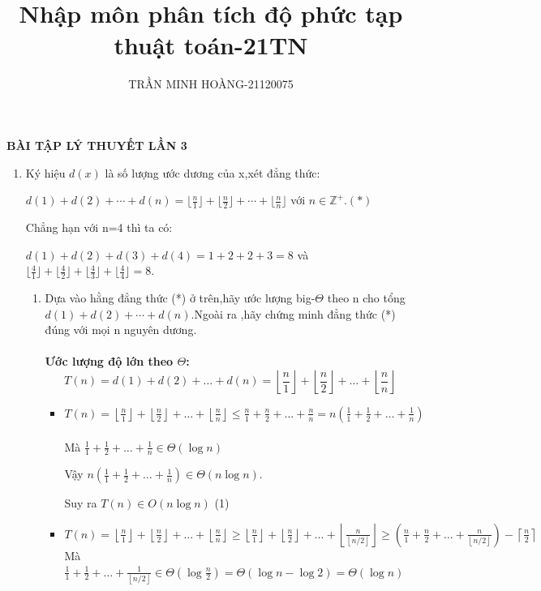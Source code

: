 \documentclass[12pt,a4paper]{article}
\title{\LARGE{\textbf{Nhập môn phân tích độ phức tạp thuật toán-21TN}}}
\author{TRẦN MINH HOÀNG-21120075}
\date{} %
\begin{document}
\maketitle
\begin{center}
    \textbf{BÀI TẬP LÝ THUYẾT LẦN 3}
\end{center}
\begin{enumerate}[label=\textbf{Câu 1:} ]
    \item Ký hiệu $d(x) $ là số lượng ước dương của x,xét đẳng thức:
          \begin{center}
              $d(1)+d(2)+\cdots+d(n)=\lfloor \frac{n}{1} \rfloor+\lfloor \frac{n}{2} \rfloor+\cdots+\lfloor \frac{n}{n} \rfloor $ với $n \in \mathbb{Z^+}.(*)$
          \end{center}
          Chẳng hạn với n=4 thì ta có:
          \begin{adjustwidth}{1cm}{}
              $d(1)+d(2)+d(3)+d(4)=1+2+2+3=8 $ và $\lfloor \frac{4}{1} \rfloor+\lfloor \frac{4}{2} \rfloor+\lfloor \frac{4}{3} \rfloor+\lfloor\frac{4}{4} \rfloor=8 .$
          \end{adjustwidth}
          \begin{enumerate}[label=\alph*)]
              \item Dựa vào hằng đẳng thức (*) ở trên,hãy ước lượng big-$\Theta $ theo n cho tổng $d(1)+d(2)+\cdots+d(n).$Ngoài ra ,hãy chứng minh đẳng thức (*) đúng với mọi n nguyên dương.\\ \\
              \textbf{Ước lượng độ lớn theo $\Theta$:}
              \[ T(n) = d(1) + d(2) + \ldots + d(n) = \left\lfloor \frac{n}{1} \right\rfloor + \left\lfloor \frac{n}{2} \right\rfloor + \ldots + \left\lfloor \frac{n}{n} \right\rfloor\]
              \begin{itemize}[label=$\bullet$]
                  \item 
              
$
T(n) = \left\lfloor \frac{n}{1} \right\rfloor + \left\lfloor \frac{n}{2} \right\rfloor + \ldots + \left\lfloor \frac{n}{n} \right\rfloor \leq \frac{n}{1} + \frac{n}{2} + \ldots + \frac{n}{n} = n \left( \frac{1}{1} + \frac{1}{2} + \ldots + \frac{1}{n} \right)$\\ \\ 
Mà $\frac{1}{1} + \frac{1}{2} + \ldots + \frac{1}{n} \in \Theta(\log n)$

Vậy $n \left( \frac{1}{1} + \frac{1}{2} + \ldots + \frac{1}{n} \right) \in \Theta(n \log n).$

Suy ra $T(n) \in O(n \log n)$ (1)
\item 
$
T(n) = \left\lfloor \frac{n}{1} \right\rfloor + \left\lfloor \frac{n}{2} \right\rfloor + \ldots + \left\lfloor \frac{n}{n} \right\rfloor \geq \left\lfloor \frac{n}{1} \right\rfloor + \left\lfloor \frac{n}{2} \right\rfloor + \ldots + \left\lfloor \frac{n}{\left\lfloor n/2 \right\rfloor} \right\rfloor \geq \left( \frac{n}{1} + \frac{n}{2} + \ldots + \frac{n}{\left\lfloor n/2 \right\rfloor} \right) - \left\lceil \frac{n}{2} \right\rceil
$
Mà $\frac{1}{1} + \frac{1}{2} + \ldots + \frac{1}{\left\lfloor n/2 \right\rfloor} \in \Theta(\log \frac{n}{2}) = \Theta(\log n - \log 2) = \Theta(\log n)$


\end{itemize}
\end{enumerate}
\end{enumerate}
\end{document}
